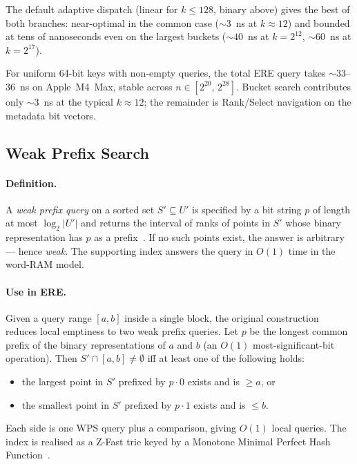 The default adaptive dispatch (linear for $k \leq 128$, binary above) gives
the best of both branches: near-optimal in the common case (${\sim}3$~ns at
$k \approx 12$) and bounded at tens of nanoseconds even on the largest
buckets (${\sim}40$~ns at $k = 2^{12}$, ${\sim}60$~ns at $k = 2^{17}$).

For uniform 64-bit keys with non-empty queries, the total ERE query takes
${\sim}33$--$36$~ns on Apple~M4~Max, stable across $n \in [2^{20},\, 2^{28}]$.
Bucket search contributes only ${\sim}3$~ns at the typical $k \approx 12$;
the remainder is Rank/Select navigation on the metadata bit vectors.

\subsection{Weak Prefix Search}
\label{sec:wps}

\paragraph{Definition.}
A \emph{weak prefix query} on a sorted set $S' \subseteq U'$ is
specified by a bit string $p$ of length at most $\log_2 |U'|$ and
returns the interval of ranks of points in $S'$ whose binary
representation has $p$ as a prefix~\citep[\S 3.2]{goswami2015approximate}.
If no such points exist, the answer is arbitrary --- hence
\emph{weak}. The supporting index answers the query in $O(1)$
time in the word-RAM model.

\paragraph{Use in ERE.}
Given a query range $[a, b]$ inside a single block, the original
construction~\citep[\S 3.2]{goswami2015approximate} reduces local
emptiness to two weak prefix queries. Let $p$ be the longest common
prefix of the binary representations of $a$ and $b$ (an $O(1)$
most-significant-bit operation). Then $S' \cap [a, b] \neq \emptyset$
iff at least one of the following holds:
\begin{itemize}
    \item the largest point in $S'$ prefixed by $p \cdot 0$ exists
    and is $\geq a$, or
    \item the smallest point in $S'$ prefixed by $p \cdot 1$ exists
    and is $\leq b$.
\end{itemize}
Each side is one WPS query plus a comparison, giving $O(1)$ local
queries. The index is realised as a Z-Fast trie keyed by a Monotone
Minimal Perfect Hash Function~\citep{belazzougui2009monotone}.

